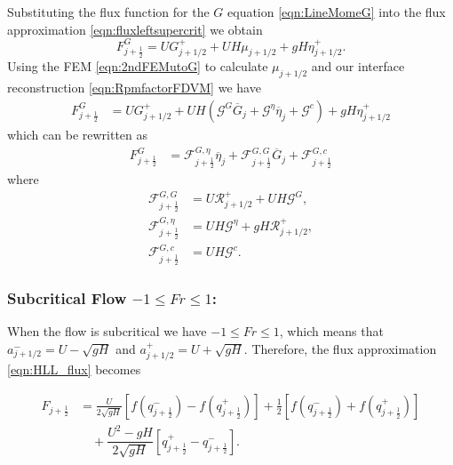 Substituting the flux function for the $G$ equation \eqref{eqn:LineMomeG} into the flux approximation \eqref{eqn:fluxleftsupercrit} we obtain
\begin{equation*}
F^G_{j+\frac{1}{2}} =U G^+_{j+1/2} + U  H \mu_{j+1/2} + gH \eta^+_{j+1/2}.
\end{equation*}
Using the FEM \eqref{eqn:2ndFEMutoG} to calculate $\mu_{j+1/2}$ and our interface reconstruction \eqref{eqn:RpmfactorFDVM} we have
\begin{align*}
F^G_{j+\frac{1}{2}} &=  U G^+_{j+1/2} + UH \left(\mathcal{G}^G \overline{G}_{j} + \mathcal{G}^{\eta} \overline{\eta}_{j} + \mathcal{G}^c\right) + gH \eta^+_{j+1/2}
\end{align*}
which can be rewritten as
\begin{align*}
F^G_{j+\frac{1}{2}} &= \mathcal{F}^{G, \eta}_{j+\frac{1}{2}} \overline{\eta}_{j} + \mathcal{F}^{G, G}_{j+\frac{1}{2}} \overline{G}_{j} + \mathcal{F}^{G, c}_{j+\frac{1}{2}}
\end{align*}
where
\begin{align*}
\mathcal{F}^{G, G}_{j+\frac{1}{2}} &=  U\mathcal{R}^+_{j+1/2}  +  UH \mathcal{G}^G, \\
\mathcal{F}^{G, \eta}_{j+\frac{1}{2}} &=  UH \mathcal{G}^{\eta} + gH \mathcal{R}^+_{j+1/2},\\
\mathcal{F}^{G, c}_{j+\frac{1}{2}} &=  UH\mathcal{G}^c.
\end{align*}


\subsubsection{Subcritical Flow $-1 \le Fr \le 1$:}
When the flow is subcritical we have $-1\le Fr \le 1$, which means that $a^-_{j+ 1/2} =U-\sqrt{g H}$ and $a^+_{j+ 1/2} =  U + \sqrt{g H}$. Therefore, the flux approximation \eqref{eqn:HLL_flux} becomes

\begin{align}
F_{j+\frac{1}{2}} &= \frac{U}{2 \sqrt{gH}} \left[f\left(q^-_{j+\frac{1}{2}}\right) - f\left(q^+_{j+\frac{1}{2}}\right) \right]  + \frac{1}{2}\left[f\left(q^-_{j+\frac{1}{2}}\right) + f\left(q^+_{j+\frac{1}{2}}\right)\right] \nonumber \\ & \quad  + \dfrac{U^2 - gH}{2\sqrt{g H}} \left [ q^+_{j+\frac{1}{2}} - q^-_{j+\frac{1}{2}} \right ].
\label{eqn:fluxsubcrit}
\end{align}

